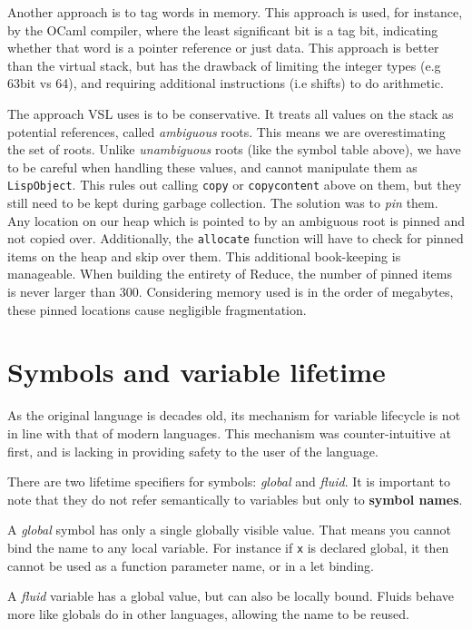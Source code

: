 Another approach is to tag words in memory. This approach is used, for instance, by the OCaml compiler, where the least
significant bit is a tag bit, indicating whether that word is a pointer reference or just data. This approach is better
than the virtual stack, but has the drawback of limiting the integer types (e.g 63bit vs 64), and requiring additional
instructions (i.e shifts) to do arithmetic.

The approach VSL uses is to be conservative. It treats all values on the stack as potential references, called \emph{ambiguous} roots.
This means we are overestimating the set of roots. Unlike \emph{unambiguous} roots (like the symbol table above), we
have to be careful when handling these values, and cannot manipulate them as \texttt{LispObject}. This rules out calling
\texttt{copy} or \texttt{copycontent} above on them, but they still need to be kept during garbage collection. The solution was
to \emph{pin} them. Any location on our heap which is pointed to by an ambiguous root is pinned and not copied over.
Additionally, the \texttt{allocate} function will have to check for pinned items on the heap and skip over them. This
additional book-keeping is manageable. When building the entirety of Reduce, the number of pinned items is never
larger than 300. Considering memory used is in the order of megabytes, these pinned locations cause negligible
fragmentation.

\section{Symbols and variable lifetime}
As the original language is decades old, its mechanism for variable lifecycle is not in line with that of modern languages.
This mechanism was counter-intuitive at first, and is lacking in providing safety to the user of the language.

There are two lifetime specifiers for symbols: \emph{global} and \emph{fluid}. It is important to note that they
do not refer semantically to variables but only to \textbf{symbol names}.

A \emph{global} symbol has only a single globally visible value. That means you cannot bind the name to any local
variable. For instance if \texttt{x} is declared global, it then cannot be used as a function parameter name, or in a
let binding.

A \emph{fluid} variable has a global value, but can also be locally bound. Fluids behave more like globals do
in other languages, allowing the name to be reused.

